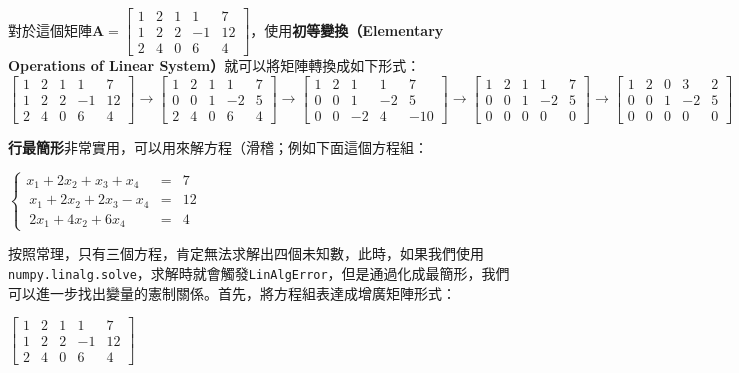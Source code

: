 \documentclass[11pt]{article}
\begin{document}
{    對於這個矩陣\(\mathbf{A} = \begin{bmatrix} 1 & 2 & 1 & 1 & 7\\ 1 & 2 & 2 & -1 & 12\\ 2 & 4 & 0 & 6 & 4 \end{bmatrix}\)，使用\textbf{初等變換（Elementary
Operations of Linear System）}就可以將矩陣轉換成如下形式：
\(\begin{bmatrix} 1 & 2 & 1 & 1 & 7\\ 1 & 2 & 2 & -1 & 12\\ 2 & 4 & 0 & 6 & 4 \end{bmatrix} \rightarrow \begin{bmatrix} 1 & 2 & 1 & 1 & 7\\ 0 & 0 & 1 & -2 & 5\\ 2 & 4 & 0 & 6 & 4 \end{bmatrix} \rightarrow \begin{bmatrix} 1 & 2 & 1 & 1 & 7\\ 0 & 0 & 1 & -2 & 5\\ 0 & 0 & -2 & 4 & -10 \end{bmatrix} \rightarrow \begin{bmatrix} 1 & 2 & 1 & 1 & 7\\ 0 & 0 & 1 & -2 & 5\\ 0 & 0 & 0 & 0 & 0 \end{bmatrix} \rightarrow \begin{bmatrix} 1 & 2 & 0 & 3 & 2\\ 0 & 0 & 1 & -2 & 5\\ 0 & 0 & 0 & 0 & 0 \end{bmatrix}\)

    \textbf{行最簡形}非常實用，可以用來解方程（滑稽；例如下面這個方程組：

\(\left\{ \begin{eqnarray} x_1 + 2x_2 + x_3 + x_4 &=& 7 \\\
x_1 + 2x_2 + 2x_3 - x_4 &=& 12 \\\
2x_1 + 4x_2 + 6x_4 &=& 4 \end{eqnarray} \right.\)

    按照常理，只有三個方程，肯定無法求解出四個未知數，此時，如果我們使用\texttt{numpy.linalg.solve}，求解時就會觸發\texttt{LinAlgError}，但是通過化成最簡形，我們可以進一步找出變量的憲制關係。首先，將方程組表達成增廣矩陣形式：

\(\begin{bmatrix} 1 & 2 & 1 & 1 & 7\\ 1 & 2 & 2 & -1 & 12\\ 2 & 4 & 0 & 6 & 4 \end{bmatrix}\)

}
\end{document}
